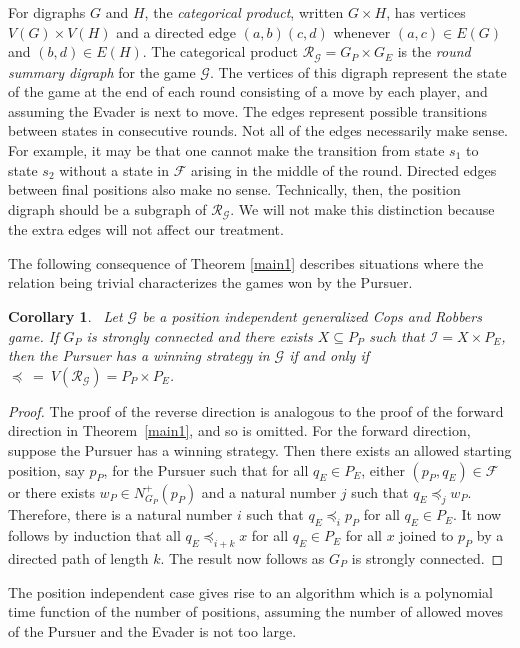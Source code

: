 \documentclass[12pt,reqno]{amsart}
\newtheorem{corollary}[theorem]{Corollary}
\begin{document}
For digraphs $G$ and $H$, the \emph{categorical product}, written $G \times H$, has vertices $V(G)\times V(H)$ and a directed edge $(a,b)(c,d)$ whenever $(a,c)\in E(G)$ and $(b,d) \in E(H)$. The
categorical product $\mathcal{R}_{\mathcal{G}} = G_P \times G_E$ is the \emph{round summary digraph} for the game $\mathcal{G}$.  The vertices of this digraph represent the state of the game at the
end of each round consisting of a move by each player, and assuming the Evader is next to move.  The edges represent possible transitions between states in consecutive rounds.  Not all of the edges
necessarily make sense.  For example, it may be that one cannot make the transition from state $s_1$ to state $s_2$ without a state in $\mathcal{F}$ arising in the middle of the round.  Directed
edges between final positions also make no sense. Technically, then, the position digraph should be a subgraph of $\mathcal{R}_{\mathcal{G}}$.  We will not make this distinction because the extra
edges will not affect our treatment.

The following consequence of Theorem \ref{main1} describes situations where the relation being trivial characterizes the games won by the Pursuer.

\smallskip
\begin{corollary}~\label{cor1}
Let $\mathcal{G}$ be a position independent generalized Cops and Robbers game. If $G_P$ is strongly connected and there exists $X \subseteq P_P$ such that $\mathcal{I} = X \times P_E$, then the
Pursuer has a winning strategy in $\mathcal{G}$ if and only if $\preceq\ =\  V(\mathcal{R}_{\mathcal{G}}) =P_P\times P_E$.
\end{corollary}
\begin{proof}
 The proof of the reverse direction is analogous to the proof of the forward direction in Theorem~\ref{main1}, and so is omitted. For the forward direction, suppose the Pursuer has a winning strategy.
Then there exists an allowed starting position, say $p_P$, for the Pursuer such that for all $q_E \in P_E$, either $(p_P, q_E) \in \mathcal{F}$ or there exists $w_P \in N^+_{G_P}(p_P)$ and a natural
number $j$ such that $q_E \preceq_j w_P$. Therefore, there is a natural number $i$ such that $q_E \preceq_i p_P$ for all $q_E \in P_E$.  It now follows by induction that all $q_E \preceq_{i+k} x$ for
all $q_E \in P_E$ for all $x$ joined to $p_P$ by a directed path of length $k$.  The result now follows as $G_P$ is strongly connected.
\end{proof}

The position independent case gives rise to an algorithm which is a polynomial time function of the number of positions, assuming the number of allowed moves of the Pursuer and the Evader is not too
large.
\end{document}
